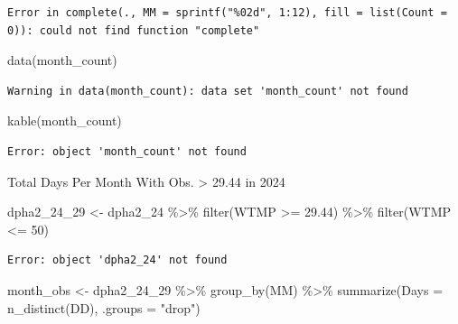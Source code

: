 \documentclass[
  letterpaper,
  DIV=11,
  numbers=noendperiod]{scrreprt}
\newenvironment{Shaded}{\begin{snugshade}}{\end{snugshade}}
\newcommand{\AttributeTok}[1]{\textcolor[rgb]{0.40,0.45,0.13}{#1}}
\newcommand{\DecValTok}[1]{\textcolor[rgb]{0.68,0.00,0.00}{#1}}
\newcommand{\FloatTok}[1]{\textcolor[rgb]{0.68,0.00,0.00}{#1}}
\newcommand{\FunctionTok}[1]{\textcolor[rgb]{0.28,0.35,0.67}{#1}}
\newcommand{\NormalTok}[1]{\textcolor[rgb]{0.00,0.23,0.31}{#1}}
\newcommand{\OtherTok}[1]{\textcolor[rgb]{0.00,0.23,0.31}{#1}}
\newcommand{\SpecialCharTok}[1]{\textcolor[rgb]{0.37,0.37,0.37}{#1}}
\newcommand{\StringTok}[1]{\textcolor[rgb]{0.13,0.47,0.30}{#1}}
\begin{document}
\begin{verbatim}
Error in complete(., MM = sprintf("%02d", 1:12), fill = list(Count = 0)): could not find function "complete"
\end{verbatim}

\begin{Shaded}
\begin{Highlighting}[]
\FunctionTok{data}\NormalTok{(month\_count)}
\end{Highlighting}
\end{Shaded}

\begin{verbatim}
Warning in data(month_count): data set 'month_count' not found
\end{verbatim}

\begin{Shaded}
\begin{Highlighting}[]
\FunctionTok{kable}\NormalTok{(month\_count)}
\end{Highlighting}
\end{Shaded}

\begin{verbatim}
Error: object 'month_count' not found
\end{verbatim}

Total Days Per Month With Obs. \textgreater{} 29.44 in 2024

\begin{Shaded}
\begin{Highlighting}[]
\NormalTok{dpha2\_24\_29 }\OtherTok{\textless{}{-}}\NormalTok{ dpha2\_24 }\SpecialCharTok{\%\textgreater{}\%}
  \FunctionTok{filter}\NormalTok{(WTMP }\SpecialCharTok{\textgreater{}=} \FloatTok{29.44}\NormalTok{) }\SpecialCharTok{\%\textgreater{}\%}
  \FunctionTok{filter}\NormalTok{(WTMP }\SpecialCharTok{\textless{}=} \DecValTok{50}\NormalTok{)}
\end{Highlighting}
\end{Shaded}

\begin{verbatim}
Error: object 'dpha2_24' not found
\end{verbatim}

\begin{Shaded}
\begin{Highlighting}[]
\NormalTok{month\_obs }\OtherTok{\textless{}{-}}\NormalTok{ dpha2\_24\_29 }\SpecialCharTok{\%\textgreater{}\%}
  \FunctionTok{group\_by}\NormalTok{(MM) }\SpecialCharTok{\%\textgreater{}\%}
  \FunctionTok{summarize}\NormalTok{(}\AttributeTok{Days =} \FunctionTok{n\_distinct}\NormalTok{(DD), }\AttributeTok{.groups =} \StringTok{"drop"}\NormalTok{)}
\end{Highlighting}
\end{Shaded}
\end{document}
